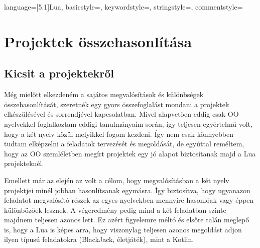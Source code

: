 


{
	language=[5.1]Lua,
	basicstyle=\ttfamily,
	keywordstyle=\color{orange},
	stringstyle=\color{olivegreen},
	commentstyle=\color{black!50}
}



\chapter{Projektek összehasonlítása}
\label{chap:04_porjects}

\section{Kicsit a projektekről}
\label{sec:p_about}

Még mielőtt elkezdeném a sajátos megvalósítások és különbségek összehasonlítását, szeretnék egy gyors összefoglalást mondani a projektek elkészülésével és sorrendjével kapcsolatban. Mivel alapvetően eddig csak OO nyelvekkel foglalkoztam eddigi tanulmányaim során, így teljesen egyértelmű volt, hogy a két nyelv közül melyikkel fogom kezdeni. Így nem csak könnyebben tudtam elképzelni a feladatok tervezését és megoldását, de egyúttal reméltem, hogy az OO szemléletben megírt projektek egy jó alapot biztosítanak majd a Lua projekteknél.

Emellett már az elején az volt a célom, hogy megvalósításban a két nyelv projektjei minél jobban hasonlítsanak egymásra. Így biztosítva, hogy ugyanazon feladatot megvalósító részek az egyes nyelvekben mennyire hasonlóak vagy éppen különbözőek lesznek. A végeredmény pedig mind a két feladatban szinte majdnem teljesen azonos lett. Ez azért figyelemre méltó és elsőre talán meglepő is, hogy a Lua is képes arra, hogy viszonylag teljesen azonos megoldást adjon ilyen típusú feladatokra (BlackJack, életjáték), mint a Kotlin.


